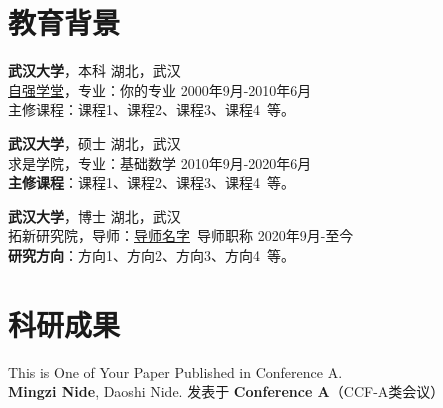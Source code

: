     \section{\makebox[\widthof{\faGraduationCap}][c]{\color{WHU_Blue}{\faGraduationCap}}\quad 教育背景}


    {\large \textbf{武汉大学}}，本科 \hfill {湖北，武汉} \\
    \href{学院官网.whu.edu.cn}{\underline{自强学堂}}，专业：你的专业 \hfill {2000年9月-2010年6月} \\
    {主修课程}：课程1、课程2、课程3、课程4\ 等。

    \vspace{0.5em}
    {\large \textbf{武汉大学}}，硕士 \hfill {湖北，武汉} \\
    {{求是学院}}，专业：基础数学 \hfill {2010年9月-2020年6月} \\
    \textbf{主修课程}：课程1、课程2、课程3、课程4\ 等。

    \vspace{0.5em}
    {\large \textbf{武汉大学}}，博士 \hfill {湖北，武汉} \\
    {{拓新研究院}}，导师：\href{导师的个人主页.site}{导师名字}\ 导师职称 \hfill {2020年9月-至今} \\
    \textbf{研究方向}：方向1、方向2、方向3、方向4\ 等。

    \section{\makebox[\widthof{\faGraduationCap}][c]{\color{WHU_Blue}{\faGraduationCap}}\quad 科研成果}


    This is One of Your Paper Published in Conference A. \\
    \textbf{Mingzi Nide}, Daoshi Nide. \hfill 
    发表于 \textbf{Conference A}（CCF-A类会议） 

